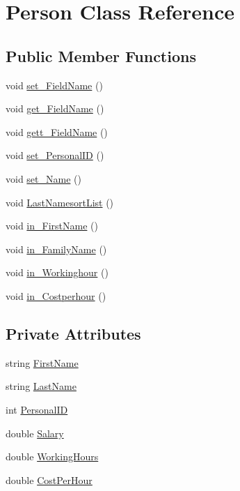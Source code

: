 \hypertarget{classPerson}{}\section{Person Class Reference}
\label{classPerson}
\subsection*{Public Member Functions}
\begin{DoxyCompactItemize}
\item 
void \hyperlink{classPerson_a3abd7c29b92129b97a4f1000cced9c51}{set\+\_\+\+Field\+Name} ()
\item 
void \hyperlink{classPerson_a0ba48694a16ae01e279dcecca67206a1}{get\+\_\+\+Field\+Name} ()
\item 
void \hyperlink{classPerson_afbebe8ff11b9cf25b6df5eda1df0b447}{gett\+\_\+\+Field\+Name} ()
\item 
void \hyperlink{classPerson_a3d43cd58a6006f81794caa94c07810d6}{set\+\_\+\+Personal\+ID} ()
\item 
void \hyperlink{classPerson_aa78b51ba4294454e9e693b7f9a68330b}{set\+\_\+\+Name} ()
\item 
void \hyperlink{classPerson_aa31e49027355ebe88555ed25144edd24}{Last\+Namesort\+List} ()
\item 
void \hyperlink{classPerson_a07320273da2b8a6957300d20d4594195}{in\+\_\+\+First\+Name} ()
\item 
void \hyperlink{classPerson_a7ebc969ff71b7a9f93ff1e88a94c78d2}{in\+\_\+\+Family\+Name} ()
\item 
void \hyperlink{classPerson_a1aac8b7a7c6fa6c4ed3c7ce96d98c65e}{in\+\_\+\+Workinghour} ()
\item 
void \hyperlink{classPerson_a81602e50aff78c8f2d8eef65f422388a}{in\+\_\+\+Costperhour} ()
\end{DoxyCompactItemize}
\subsection*{Private Attributes}
\begin{DoxyCompactItemize}
\item 
string \hyperlink{classPerson_aa7e415d2232d63bebe953227394bdf02}{First\+Name}
\item 
string \hyperlink{classPerson_adb7b4b0c1c6d35ff77be67f36bfae396}{Last\+Name}
\item 
int \hyperlink{classPerson_a4e13ba0eb54b26b2ef7b18022e609edb}{Personal\+ID}
\item 
double \hyperlink{classPerson_a096ebbbd6a4a7552bf385aa67e379345}{Salary}
\item 
double \hyperlink{classPerson_aadb5de5c82650fdfa71c51caada68e4f}{Working\+Hours}
\item 
double \hyperlink{classPerson_a7ac09228195bedb1247a9d070de63dfe}{Cost\+Per\+Hour}
\end{DoxyCompactItemize}


